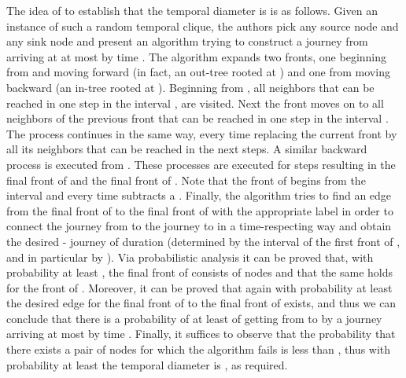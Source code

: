 \documentclass[oribibl, 11pt]{llncs}
\begin{document}
The idea of \cite{AGMS14} to establish that the temporal diameter is  is as follows. Given an instance of such a random temporal clique, the authors pick any source node  and any sink node  and present an algorithm trying to construct a journey from  arriving at  at most by time . The algorithm expands two fronts, one beginning from  and moving forward (in fact, an out-tree rooted at ) and one from  moving backward (an in-tree rooted at ). Beginning from , all neighbors that can be reached in one step in the interval , are visited. Next the front moves on to all neighbors of the previous front that can be reached in one step in the interval . The process continues in the same way, every time replacing the current front by all its neighbors that can be reached in the next  steps. A similar backward process is executed from . These processes are executed for  steps resulting in the final front of  and the final front of . Note that the front of  begins from the interval  and every time subtracts a . Finally, the algorithm tries to find an edge from the final front of  to the final front of  with the appropriate label in order to connect the journey from  to the journey to  in a time-respecting way and obtain the desired - journey of duration  (determined by the interval of the first front of , and in particular by ). Via probabilistic analysis it can be proved that, with probability at least , the final front of  consists of  nodes and that the same holds for the front of . Moreover, it can be proved that again with probability at least  the desired edge for the final front of  to the final front of  exists, and thus we can conclude that there is a probability of at least  of getting from  to  by a journey arriving at most by time . Finally, it suffices to observe that the probability that there exists a pair of nodes  for which the algorithm fails is less than , thus with probability at least  the temporal diameter is , as required.
\end{document}
